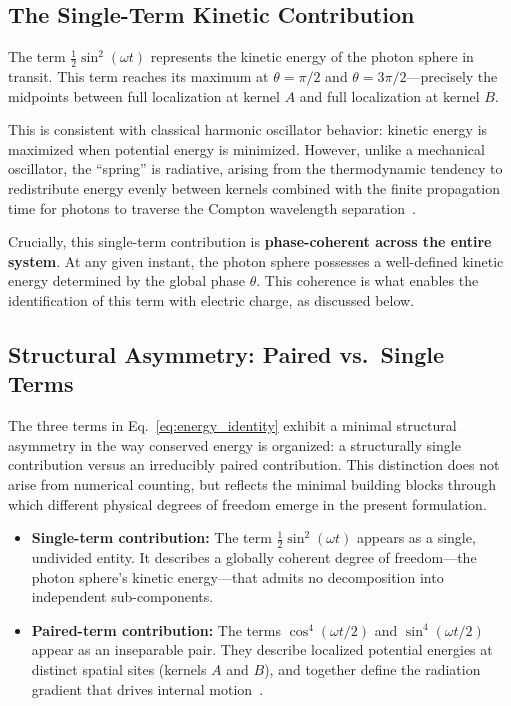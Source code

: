 \documentclass[12pt,letterpaper]{article}
\begin{document}
\subsection{The Single-Term Kinetic Contribution}

The term $\frac{1}{2}\sin^2(\omega t)$ represents the kinetic energy of the photon sphere in transit. This term reaches its maximum at $\theta = \pi/2$ and $\theta = 3\pi/2$---precisely the midpoints between full localization at kernel $A$ and full localization at kernel $B$.

This is consistent with classical harmonic oscillator behavior: kinetic energy is maximized when potential energy is minimized. However, unlike a mechanical oscillator, the ``spring'' is radiative, arising from the thermodynamic tendency to redistribute energy evenly between kernels combined with the finite propagation time for photons to traverse the Compton wavelength separation~\cite{hanamura17765017}.

Crucially, this single-term contribution is \textbf{phase-coherent across the entire system}. At any given instant, the photon sphere possesses a well-defined kinetic energy determined by the global phase $\theta$. This coherence is what enables the identification of this term with electric charge, as discussed below.

\subsection{Structural Asymmetry: Paired vs.\ Single Terms}

The three terms in Eq.~\eqref{eq:energy_identity} exhibit a minimal structural asymmetry in the way conserved energy is organized: a structurally single contribution versus an irreducibly paired contribution. This distinction does not arise from numerical counting, but reflects the minimal building blocks through which different physical degrees of freedom emerge in the present formulation.

\begin{itemize}
\item \textbf{Single-term contribution:} The term $\frac{1}{2}\sin^2(\omega t)$ appears as a single, undivided entity. It describes a globally coherent degree of freedom---the photon sphere's kinetic energy---that admits no decomposition into independent sub-components.

\item \textbf{Paired-term contribution:} The terms $\cos^4(\omega t/2)$ and $\sin^4(\omega t/2)$ appear as an inseparable pair. They describe localized potential energies at distinct spatial sites (kernels $A$ and $B$), and together define the radiation gradient that drives internal motion~\cite{hanamura18356895}.
\end{itemize}
\end{document}
